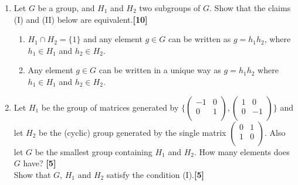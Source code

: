\documentclass[a4paper]{article}
\begin{document}
\begin{qns}\leavevmode
\begin{enumerate}[label=(\alph*)]
\item Let $G$ be a group, and $H_1$ and $H_2$ two subgroups of $G$. Show that the claims (I) and (II) below are equivalent.\hfill\textbf{[10]}
\begin{enumerate}[label=\Roman*.]
    \item $H_1\cap H_2 = \{1\}$ and any element $g\in G$ can be written as $g = h_1h_2$, where $h_1\in H_1$ and $h_2\in H_2$.
    \item Any element $g\in G$ can be written in a unique way as $g = h_1h_2$ where $h_1\in H_1$ and $h_2\in H_2$.
\end{enumerate}
\item Let $H_1$ be the group of matrices generated by $\bigg\{\begin{pmatrix}-1&0\\0&1\\\end{pmatrix},\begin{pmatrix}1&0\\0&-1\\\end{pmatrix}\bigg\}$ and let $H_2$ be the (cyclic) group generated by the single matrix $\begin{pmatrix}0&1\\1&0\\\end{pmatrix}$. Also let $G$ be the smallest group containing $H_1$ and $H_2$. How many elements does $G$ have? \hfill\textbf{[5]}\\[5pt]
Show that $G$, $H_1$ and $H_2$ satisfy the condition (I).\hfill\textbf{[5]}
\end{enumerate}
\end{qns}
\end{document}
